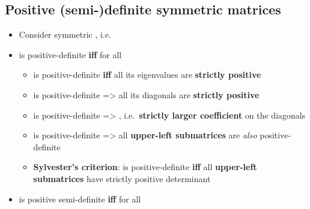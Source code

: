 
\subsection*{Positive (semi-)definite symmetric
  matrices}

\begin{itemize}

  \item
        Consider symmetric ,
        i.e.~
  \item
         is positive-definite \textbf{iff}  for all

        \begin{itemize}

          \item
                 is positive-definite \textbf{iff} all its eigenvalues are
                \textbf{strictly positive}
          \item
                 is positive-definite =\textgreater{} all its diagonals are
                \textbf{strictly positive}
          \item
                 is positive-definite =\textgreater{}
                , i.e.~\textbf{strictly
                  larger coefficient} on the diagonals
          \item
                 is positive-definite =\textgreater{} all
                \textbf{upper-left submatrices} are \emph{also} positive-definite
          \item
                \textbf{Sylvester's criterion}:  is positive-definite
                \textbf{iff} all \textbf{upper-left submatrices} have strictly
                positive determinant
        \end{itemize}
  \item
         is positive semi-definite \textbf{iff} 
        for all 

        \begin{itemize}


\end{itemize}
\end{itemize}
